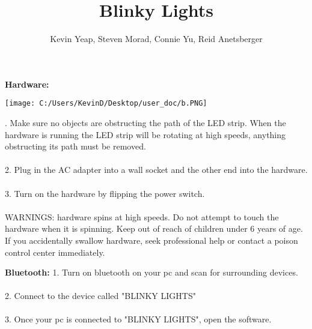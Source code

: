 \documentclass[12pt, a4paper]{ article}
\date{}
\begin{document}
 
\title{Blinky Lights} 
\author{Kevin Yeap, Steven Morad, Connie Yu, Reid Anetsberger}
\maketitle 

\iffalse
    This is a block comment.
    This line is also inside the block comment.
\fi



\noindent
\textbf{Hardware:} 

\vspace{1cm}

\texttt{[image: C:/Users/KevinD/Desktop/user\_doc/b.PNG]}


\vspace {1cm }
. Make sure no objects are obstructing the path of the LED strip. When the hardware is running the LED strip will be rotating at high speeds,  anything obstructing its path must be removed.\\\\
2. Plug in the AC adapter into a wall socket and the other end into the hardware.
\\\\
3. Turn on the hardware by flipping the power switch.
\\\\


WARNINGS: hardware spins at high speeds. Do not attempt to touch the hardware when it is spinning. 
Keep out of reach of children under 6 years of age. If you accidentally swallow hardware, seek professional help or contact a poison control center immediately.


\vspace{6cm}




\textbf{Bluetooth:} 
1. Turn on bluetooth on your pc and scan for surrounding devices.
 \\\\
2. Connect to the device called "BLINKY LIGHTS"
\\\\
3. Once your pc is connected to "BLINKY LIGHTS", open the software.
\\\\
\end{document}
